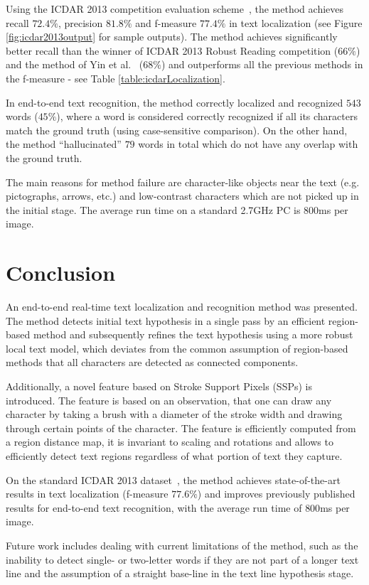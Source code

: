 \documentclass[conference]{IEEEtran}
\begin{document}
Using the ICDAR 2013 competition evaluation scheme~\cite{ICDAR2013}, the method achieves recall $72.4\%$, precision $81.8\%$ and f-measure $77.4\%$ in text localization (see Figure \ref{fig:icdar2013output} for sample outputs). The method achieves significantly better recall than the winner of ICDAR 2013 Robust Reading competition ($66\%$) and the method of Yin et al.~\cite{Yin-TPAMI2013} ($68\%$) and outperforms all the previous methods in the f-measure - see Table \ref{table:icdarLocalization}.

In end-to-end text recognition, the method correctly localized and recognized $543$ words ($45\%$), where a word is considered correctly recognized if all its characters match the ground truth (using case-sensitive comparison). On the other hand, the method ``hallucinated'' $79$ words in total which do not have any overlap with the ground truth.

The main reasons for method failure are character-like objects near the text (e.g. pictographs, arrows, etc.) and low-contrast characters which are not picked up in the initial stage. The average run time on a standard 2.7GHz PC is $800$ms per image.

\vspace{-10pt}
\section{Conclusion}
\label{sec:conclusion}
An end-to-end real-time text localization and recognition method was presented. The method detects initial text hypothesis in a single pass by an efficient region-based method and subsequently refines the text hypothesis using a more robust local text model, which deviates from the common assumption of region-based methods that all characters are detected as connected components.

Additionally, a novel feature based on Stroke Support Pixels (SSPs) is introduced. The feature is based on an observation, that one can draw any character by taking a brush with a diameter of the stroke width and drawing through certain points of the character. The feature is efficiently computed from a region distance map, it is invariant to scaling and rotations and allows to efficiently detect text regions regardless of what portion of text they capture.

On the standard ICDAR 2013 dataset~\cite{ICDAR2013}, the method achieves state-of-the-art results in text localization (f-measure $77.6\%$) and improves previously published results for end-to-end text recognition, with the average run time of $800$ms per image.

Future work includes dealing with current limitations of the method, such as the inability to detect single- or two-letter words if they are not part of a longer text line and the assumption of a straight base-line in the text line hypothesis stage.

\vspace{-10pt}


\end{document}
